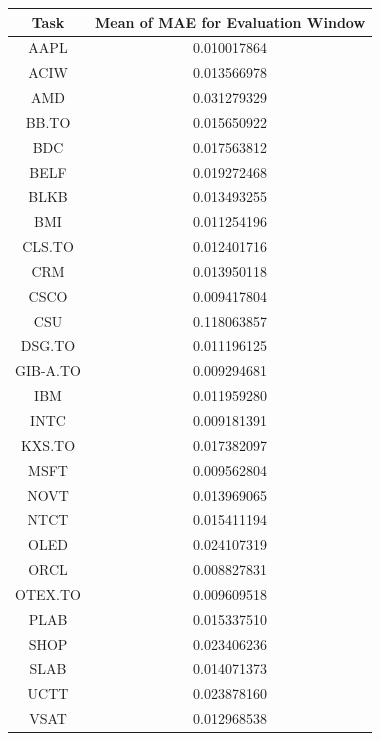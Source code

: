 \documentclass[conference]{IEEEtran}
\begin{document}
\begin{tabular}{c c}
\hline
Task & Mean of MAE for Evaluation Window \\
\hline
AAPL & 0.010017864 \\
ACIW & 0.013566978 \\
AMD & 0.031279329 \\
BB.TO & 0.015650922 \\
BDC & 0.017563812 \\
BELF & 0.019272468 \\
BLKB & 0.013493255 \\
BMI & 0.011254196 \\
CLS.TO & 0.012401716 \\
CRM & 0.013950118 \\
CSCO & 0.009417804 \\
CSU & 0.118063857 \\
DSG.TO & 0.011196125 \\
GIB-A.TO & 0.009294681 \\
IBM & 0.011959280 \\
INTC & 0.009181391 \\
KXS.TO & 0.017382097 \\
MSFT & 0.009562804 \\
NOVT & 0.013969065 \\
NTCT & 0.015411194 \\
OLED & 0.024107319 \\
ORCL & 0.008827831 \\
OTEX.TO & 0.009609518 \\
PLAB & 0.015337510 \\
SHOP & 0.023406236 \\
SLAB & 0.014071373 \\
UCTT & 0.023878160 \\
VSAT & 0.012968538 \\
\hline
\end{tabular} \\
\end{document}
